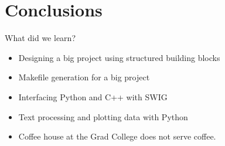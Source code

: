 \documentclass{beamer}
\begin{document}
\section{Conclusions}

\begin{frame}{What did we learn?}
\begin{itemize}
\item Designing a big project using structured building blocks
\item Makefile generation for a big project
\item Interfacing Python and C++ with SWIG
\item Text processing and plotting data with Python
\item Coffee house at the Grad College does not serve coffee.
\end{itemize}



\end{frame}
\end{document}
